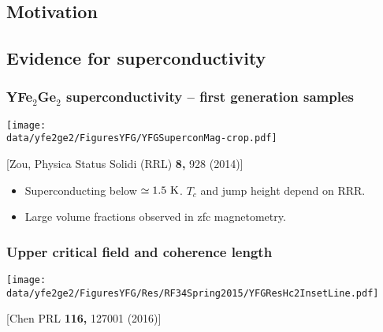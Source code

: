 \subsection{Motivation}




\subsection{Evidence for superconductivity}
\begin{frame}[label=YFGSupercon]
\frametitle{YFe$_2$Ge$_2$ superconductivity -- first
  generation samples}

\centerline{\texttt{[image: \\data/yfe2ge2/FiguresYFG/YFGSuperconMag-crop.pdf]}}
\centerline{\small [Zou, Physica Status Solidi (RRL) {\bf 8,} 928
  (2014)]}
\begin{itemize}
\item
Superconducting below $\simeq 1.5~\rm K$. $T_c$ and jump height depend on RRR.
\item
Large volume fractions observed in zfc magnetometry.
\end{itemize}
\end{frame}


\begin{frame}[label=YFGCritField211]
\frametitle{Upper critical field and coherence length}
\centerline{\texttt{[image: \\data/yfe2ge2/FiguresYFG/Res/RF34Spring2015/YFGResHc2InsetLine.pdf]}}

\centerline{\small[Chen PRL {\bf 116,} 127001 (2016)]}

\end{frame}

